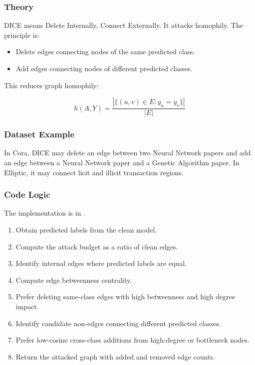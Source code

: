 \documentclass[12pt,a4paper]{article}
\begin{document}
\subsubsection{Theory}
DICE means Delete Internally, Connect Externally. It attacks homophily. The principle is:

\begin{itemize}
    \item Delete edges connecting nodes of the same predicted class.
    \item Add edges connecting nodes of different predicted classes.
\end{itemize}

This reduces graph homophily:

$$
h(A,Y)=\frac{|\{(u,v)\in E:y_u=y_v\}|}{|E|}
$$

\subsubsection{Dataset Example}
In Cora, DICE may delete an edge between two Neural Network papers and add an edge between a Neural Network paper and a Genetic Algorithm paper. In Elliptic, it may connect licit and illicit transaction regions.

\subsubsection{Code Logic}
The implementation is in .

\begin{enumerate}
    \item Obtain predicted labels from the clean model.
    \item Compute the attack budget as a ratio of clean edges.
    \item Identify internal edges where predicted labels are equal.
    \item Compute edge betweenness centrality.
    \item Prefer deleting same-class edges with high betweenness and high degree impact.
    \item Identify candidate non-edges connecting different predicted classes.
    \item Prefer low-cosine cross-class additions from high-degree or bottleneck nodes.
    \item Return the attacked graph with added and removed edge counts.
\end{enumerate}
\end{document}
